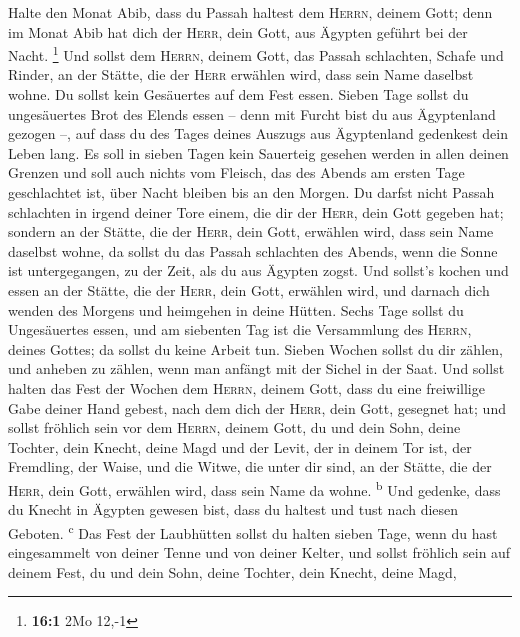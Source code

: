  Halte den Monat Abib, dass du Passah haltest dem
\textsc{Herrn}, deinem Gott; denn im Monat Abib hat dich der
\textsc{Herr}, dein Gott, aus Ägypten geführt bei der Nacht. \footnote{\textbf{16:1}
  2Mo 12,-1}  Und sollst dem \textsc{Herrn}, deinem Gott,
das Passah schlachten, Schafe und Rinder, an der Stätte, die der
\textsc{Herr} erwählen wird, dass sein Name daselbst wohne.
 Du sollst kein Gesäuertes auf dem Fest essen. Sieben Tage
sollst du ungesäuertes Brot des Elends essen -- denn mit Furcht bist du
aus Ägyptenland gezogen --, auf dass du des Tages deines Auszugs aus
Ägyptenland gedenkest dein Leben lang.  Es soll in sieben
Tagen kein Sauerteig gesehen werden in allen deinen Grenzen und soll
auch nichts vom Fleisch, das des Abends am ersten Tage geschlachtet ist,
über Nacht bleiben bis an den Morgen.  Du darfst nicht
Passah schlachten in irgend deiner Tore einem, die dir der
\textsc{Herr}, dein Gott gegeben hat;  sondern an der
Stätte, die der \textsc{Herr}, dein Gott, erwählen wird, dass sein Name
daselbst wohne, da sollst du das Passah schlachten des Abends, wenn die
Sonne ist untergegangen, zu der Zeit, als du aus Ägypten zogst.
 Und sollst's kochen und essen an der Stätte, die der
\textsc{Herr}, dein Gott, erwählen wird, und darnach dich wenden des
Morgens und heimgehen in deine Hütten.  Sechs Tage sollst
du Ungesäuertes essen, und am siebenten Tag ist die Versammlung des
\textsc{Herrn}, deines Gottes; da sollst du keine Arbeit tun.
 Sieben Wochen sollst du dir zählen, und anheben zu
zählen, wenn man anfängt mit der Sichel in der Saat.  Und
sollst halten das Fest der Wochen dem \textsc{Herrn}, deinem Gott, dass
du eine freiwillige Gabe deiner Hand gebest, nach dem dich der
\textsc{Herr}, dein Gott, gesegnet hat;  und sollst
fröhlich sein vor dem \textsc{Herrn}, deinem Gott, du und dein Sohn,
deine Tochter, dein Knecht, deine Magd und der Levit, der in deinem Tor
ist, der Fremdling, der Waise, und die Witwe, die unter dir sind, an der
Stätte, die der \textsc{Herr}, dein Gott, erwählen wird, dass sein Name
da wohne. \textsuperscript{b}  Und gedenke, dass du
Knecht in Ägypten gewesen bist, dass du haltest und tust nach diesen
Geboten. \textsuperscript{c}  Das Fest der Laubhütten
sollst du halten sieben Tage, wenn du hast eingesammelt von deiner Tenne
und von deiner Kelter,  und sollst fröhlich sein auf
deinem Fest, du und dein Sohn, deine Tochter, dein Knecht, deine Magd,
